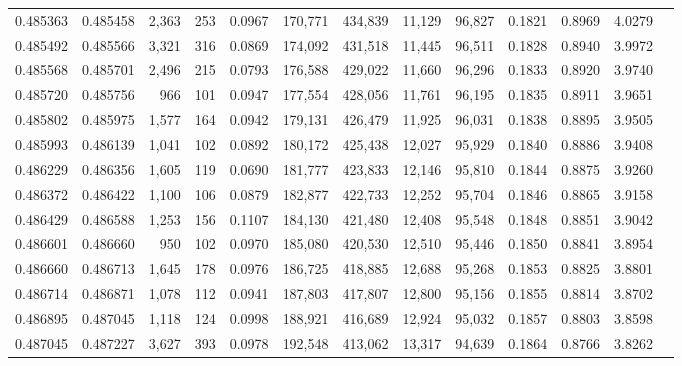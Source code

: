 \begin{tabular}{rrrrrrrrrrrrr}
0.485363 & 0.485458 & 2,363 &   253 &                                     0.0967 & 170,771 & 434,839 &  11,129 &  96,827 & 0.1821 & 0.8969 & 4.0279 \\
0.485492 & 0.485566 & 3,321 &   316 &                                     0.0869 & 174,092 & 431,518 &  11,445 &  96,511 & 0.1828 & 0.8940 & 3.9972 \\
0.485568 & 0.485701 & 2,496 &   215 &                                     0.0793 & 176,588 & 429,022 &  11,660 &  96,296 & 0.1833 & 0.8920 & 3.9740 \\
0.485720 & 0.485756 &   966 &   101 &                                     0.0947 & 177,554 & 428,056 &  11,761 &  96,195 & 0.1835 & 0.8911 & 3.9651 \\
0.485802 & 0.485975 & 1,577 &   164 &                                     0.0942 & 179,131 & 426,479 &  11,925 &  96,031 & 0.1838 & 0.8895 & 3.9505 \\
0.485993 & 0.486139 & 1,041 &   102 &                                     0.0892 & 180,172 & 425,438 &  12,027 &  95,929 & 0.1840 & 0.8886 & 3.9408 \\
0.486229 & 0.486356 & 1,605 &   119 &                                     0.0690 & 181,777 & 423,833 &  12,146 &  95,810 & 0.1844 & 0.8875 & 3.9260 \\
0.486372 & 0.486422 & 1,100 &   106 &                                     0.0879 & 182,877 & 422,733 &  12,252 &  95,704 & 0.1846 & 0.8865 & 3.9158 \\
0.486429 & 0.486588 & 1,253 &   156 &                                     0.1107 & 184,130 & 421,480 &  12,408 &  95,548 & 0.1848 & 0.8851 & 3.9042 \\
0.486601 & 0.486660 &   950 &   102 &                                     0.0970 & 185,080 & 420,530 &  12,510 &  95,446 & 0.1850 & 0.8841 & 3.8954 \\
0.486660 & 0.486713 & 1,645 &   178 &                                     0.0976 & 186,725 & 418,885 &  12,688 &  95,268 & 0.1853 & 0.8825 & 3.8801 \\
0.486714 & 0.486871 & 1,078 &   112 &                                     0.0941 & 187,803 & 417,807 &  12,800 &  95,156 & 0.1855 & 0.8814 & 3.8702 \\
0.486895 & 0.487045 & 1,118 &   124 &                                     0.0998 & 188,921 & 416,689 &  12,924 &  95,032 & 0.1857 & 0.8803 & 3.8598 \\
0.487045 & 0.487227 & 3,627 &   393 &                                     0.0978 & 192,548 & 413,062 &  13,317 &  94,639 & 0.1864 & 0.8766 & 3.8262 \\

\end{tabular}
